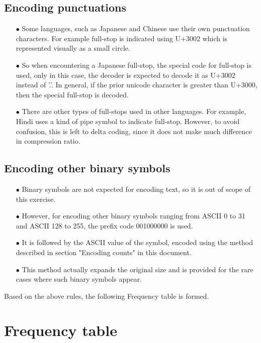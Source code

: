 \documentclass[]{article}
\begin{document}
\subsection{Encoding punctuations}
\begin{itemize}
	\item[$\bullet$] Some languages, such as Japanese and Chinese use their own punctuation characters.  For example full-stop is indicated using U+3002 which is represented visually as a small circle.
	\item[$\bullet$] So when encountering a Japanese full-stop, the special code for full-stop is used, only in this case, the decoder is expected to decode it as U+3002 instead of '.'.  In general, if the prior unicode character is greater than U+3000, then the special full-stop is decoded.
	\item[$\bullet$] There are other types of full-stops used in other languages.  For example, Hindi uses a kind of pipe symbol to indicate full-stop.  However, to avoid confusion, this is left to delta coding, since it does not make much difference in compression ratio.
\end{itemize}

\subsection{Encoding other binary symbols}
\begin{itemize}
	\item[$\bullet$]Binary symbols are not expected for encoding text, so it is out of scope of this exercise.
	\item[$\bullet$] However, for encoding other binary symbols ranging from ASCII 0 to 31 and ASCII 128 to 255, the prefix code 001000000 is used.
	\item[$\bullet$] It is followed by the ASCII value of the symbol, encoded using the method described in section "Encoding counts" in this document.
	\item[$\bullet$] This method actually expands the original size and is provided for the rare cases where such binary symbols appear.
\end{itemize}

Based on the above rules, the following Frequency table is formed.

\section{Frequency table}
\end{document}
